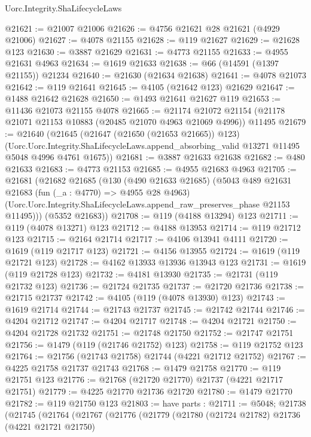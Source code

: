 \begin{lexlean}{Uorc.Integrity.ShaLifecycleLaws}
\begin{coremodule}
@21621 := @21007 @21006
@21626 := @4756 @21621 @28 @21621 (@4929 @21006)
@21627 := @4078 @21155
@21628 := @119 @21627
@21629 := @21628 @123
@21630 := @3887 @21629
@21631 := @4773 @21155
@21633 := @4955 @21631 @4963
@21634 := @1619 @21633
@21638 := @66 (@14591 (@1397 @21155)) @21234
@21640 := @21630 (@21634 @21638)
@21641 := @4078 @21073
@21642 := @119 @21641
@21645 := @4105 (@21642 @123) @21629
@21647 := @1488 @21642 @21628
@21650 := @1493 @21641 @21627 @119
@21653 := @11436 @21073 @21155 @4078
@21665 := @21174
    @21072
    @21154
    (@21178 @21071 @21153 @10883 (@20485 @21070 @4963 @21069 @4996))
    @11495
@21679 := @21640
    (@21645
      (@21647 (@21650 (@21653 @21665)) @123)
      (Uorc.Uorc.Integrity.ShaLifecycleLaws.append_absorbing_valid
        @13271
        @11495
        @5048
        @4996
        @4761
        @1675))
@21681 := @3887 @21633 @21638
@21682 := @480 @21633
@21683 := @4773 @21153
@21685 := @4955 @21683 @4963
@21705 := @21681
    (@21682
      @21685
      (@130
        (@490 @21633 @21685)
        (@5043
          @489
          @21631
          @21683
          (fun (_a : @4770) => @4955 @28 @4963)
          (Uorc.Uorc.Integrity.ShaLifecycleLaws.append_raw_preserves_phase @21153 @11495)))
      (@5352 @21683))
@21708 := @119 (@4188 @13294) @123
@21711 := @119 (@4078 @13271) @123
@21712 := @4188 @13953
@21714 := @119 @21712 @123
@21715 := @2164 @21714
@21717 := @4106 @13941 @4111
@21720 := @1619 (@119 @21717 @123)
@21721 := @4156 @13955
@21724 := @1619 (@119 @21721 @123)
@21728 := @4162 @13933 @13936 @13943 @123
@21731 := @1619 (@119 @21728 @123)
@21732 := @4181 @13930
@21735 := @21731 (@119 @21732 @123)
@21736 := @21724 @21735
@21737 := @21720 @21736
@21738 := @21715 @21737
@21742 := @4105 (@119 (@4078 @13930) @123)
@21743 := @1619 @21714
@21744 := @21743 @21737
@21745 := @21742 @21744
@21746 := @4204 @21712
@21747 := @4204 @21717
@21748 := @4204 @21721
@21750 := @4204 @21728 @21732
@21751 := @21748 @21750
@21752 := @21747 @21751
@21756 := @1479 (@119 (@21746 @21752) @123)
@21758 := @119 @21752 @123
@21764 := @21756 (@21743 @21758) @21744 (@4221 @21712 @21752)
@21767 := @4225 @21758 @21737 @21743
@21768 := @1479 @21758
@21770 := @119 @21751 @123
@21776 := @21768 (@21720 @21770) @21737 (@4221 @21717 @21751)
@21779 := @4225 @21770 @21736 @21720
@21780 := @1479 @21770
@21782 := @119 @21750 @123
@21803 := have parts : @21711 := @5048;
  @21738
    (@21745
      (@21764
        (@21767
          (@21776
            (@21779
              (@21780
                (@21724 @21782)
                @21736
                (@4221 @21721 @21750)

\end{coremodule}
\end{lexlean}
